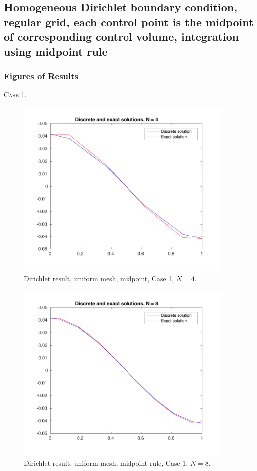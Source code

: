 \documentclass[a4paper]{article}
\numberwithin{equation}{section}
\begin{document}
\subsection{Homogeneous Dirichlet boundary condition, regular grid, each control point is the midpoint of corresponding control volume, integration using midpoint rule}
\subsubsection{Figures of Results}
\newpage
\textsc{Case 1.}
\begin{figure}[H]
\centering\includegraphics[width=10.5cm]{fig_dirichlet_result_uniform_midpoint_N4_C1}
\caption{Dirichlet result, uniform mesh, midpoint, Case 1, $N=4$.}
\end{figure}
\begin{figure}[H]
\centering\includegraphics[width=10.5cm]{fig_dirichlet_result_uniform_midpoint_N8_C1}
\caption{Dirichlet result, uniform mesh, midpoint rule, Case 1, $N=8$.}
\end{figure}
\end{document}
